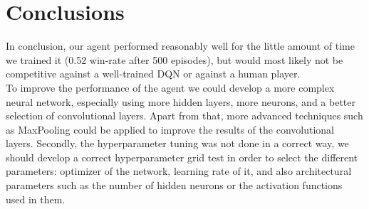 \documentclass[12pt]{article}
\begin{document}
\section{Conclusions}

In conclusion, our agent performed reasonably well for the little amount of time we trained it (0.52 win-rate after 500 episodes), but would most likely not be competitive against a well-trained DQN or against a human player.\\

To improve the performance of the agent we could develop a more complex neural network, especially using more hidden layers, more neurons, and a better selection of convolutional layers. Apart from that, more advanced techniques such as MaxPooling could be applied to improve the results of the convolutional layers. Secondly, the hyperparameter tuning was not done in a correct way, we should develop a correct hyperparameter grid test in order to select the different parameters: optimizer of the network, learning rate of it, and also architectural parameters such as the number of hidden neurons or the activation functions used in them.


\end{document}
